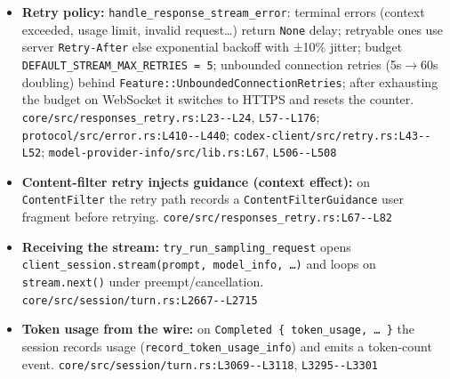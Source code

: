 \begin{itemize}
\item \textbf{Retry policy:} \texttt{handle\_\allowbreak{}response\_\allowbreak{}stream\_\allowbreak{}error}: terminal errors (context exceeded, usage limit, invalid request\ldots{}) return \texttt{None} delay; retryable ones use server \texttt{Retry-\allowbreak{}After} else exponential backoff with ±10\% jitter; budget \texttt{DEFAULT\_\allowbreak{}STREAM\_\allowbreak{}MAX\_\allowbreak{}RETRIES = 5}; unbounded connection retries (5s$\rightarrow$60s doubling) behind \texttt{Feature:\allowbreak{}:\allowbreak{}UnboundedConnectionRetries}; after exhausting the budget on WebSocket it switches to HTTPS and resets the counter. \texttt{core/\allowbreak{}src/\allowbreak{}responses\_\allowbreak{}retry.\allowbreak{}rs:\allowbreak{}L23-\allowbreak{}-\allowbreak{}L24}, \texttt{L57-\allowbreak{}-\allowbreak{}L176}; \texttt{protocol/\allowbreak{}src/\allowbreak{}error.\allowbreak{}rs:\allowbreak{}L410-\allowbreak{}-\allowbreak{}L440}; \texttt{codex-\allowbreak{}client/\allowbreak{}src/\allowbreak{}retry.\allowbreak{}rs:\allowbreak{}L43-\allowbreak{}-\allowbreak{}L52}; \texttt{model-\allowbreak{}provider-\allowbreak{}info/\allowbreak{}src/\allowbreak{}lib.\allowbreak{}rs:\allowbreak{}L67}, \texttt{L506-\allowbreak{}-\allowbreak{}L508}
\item \textbf{Content-filter retry injects guidance (context effect):} on \texttt{ContentFilter} the retry path records a \texttt{ContentFilterGuidance} user fragment before retrying. \texttt{core/\allowbreak{}src/\allowbreak{}responses\_\allowbreak{}retry.\allowbreak{}rs:\allowbreak{}L67-\allowbreak{}-\allowbreak{}L82}
\item \textbf{Receiving the stream:} \texttt{try\_\allowbreak{}run\_\allowbreak{}sampling\_\allowbreak{}request} opens \texttt{client\_\allowbreak{}session.\allowbreak{}stream(\allowbreak{}prompt, model\_\allowbreak{}info, \ldots{})} and loops on \texttt{stream.\allowbreak{}next(\allowbreak{})} under preempt/cancellation. \texttt{core/\allowbreak{}src/\allowbreak{}session/\allowbreak{}turn.\allowbreak{}rs:\allowbreak{}L2667-\allowbreak{}-\allowbreak{}L2715}
\item \textbf{Token usage from the wire:} on \texttt{Completed \{ token\_\allowbreak{}usage, \ldots{} \}} the session records usage (\texttt{record\_\allowbreak{}token\_\allowbreak{}usage\_\allowbreak{}info}) and emits a token-count event. \texttt{core/\allowbreak{}src/\allowbreak{}session/\allowbreak{}turn.\allowbreak{}rs:\allowbreak{}L3069-\allowbreak{}-\allowbreak{}L3118}, \texttt{L3295-\allowbreak{}-\allowbreak{}L3301}

\end{itemize}
